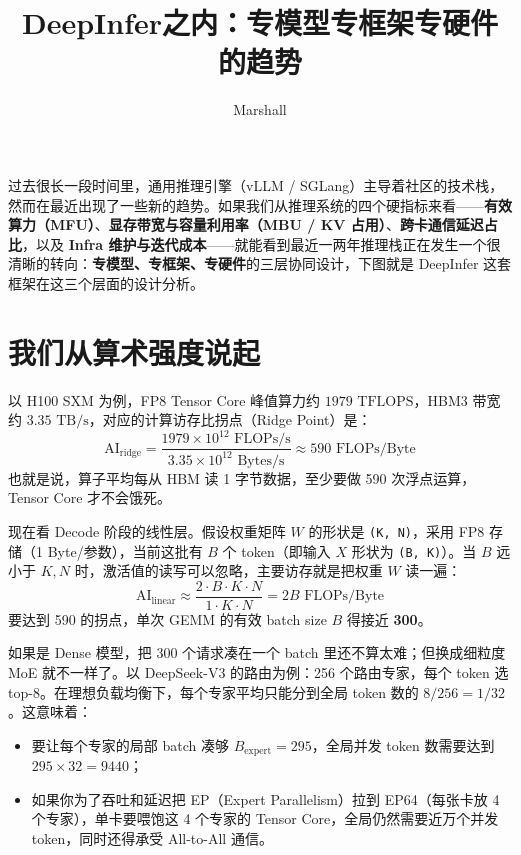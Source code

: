 \documentclass[11pt]{article}
\title{DeepInfer之内：专模型专框架专硬件的趋势}
\author{Marshall}
\begin{document}
\maketitle

过去很长一段时间里，通用推理引擎（vLLM / SGLang）主导着社区的技术栈，然而在最近出现了一些新的趋势。如果我们从推理系统的四个硬指标来看——\textbf{有效算力（MFU）}、\textbf{显存带宽与容量利用率（MBU / KV 占用）}、\textbf{跨卡通信延迟占比}，以及 \textbf{Infra 维护与迭代成本}——就能看到最近一两年推理栈正在发生一个很清晰的转向：\textbf{专模型、专框架、专硬件}的三层协同设计，下图就是 DeepInfer 这套框架在这三个层面的设计分析。

\section{我们从算术强度说起}

以 H100 SXM 为例，FP8 Tensor Core 峰值算力约 $1979\text{ TFLOPS}$，HBM3 带宽约 $3.35\text{ TB/s}$，对应的计算访存比拐点（Ridge Point）是：
\[
  \text{AI}_{\text{ridge}} = \frac{1979 \times 10^{12}\text{ FLOPs/s}}{3.35 \times 10^{12}\text{ Bytes/s}} \approx 590\text{ FLOPs/Byte}
\]
也就是说，算子平均每从 HBM 读 1 字节数据，至少要做 590 次浮点运算，Tensor Core 才不会饿死。

现在看 Decode 阶段的线性层。假设权重矩阵 $W$ 的形状是 \texttt{(K, N)}，采用 FP8 存储（1 Byte/参数），当前这批有 $B$ 个 token（即输入 $X$ 形状为 \texttt{(B, K)}）。当 $B$ 远小于 $K, N$ 时，激活值的读写可以忽略，主要访存就是把权重 $W$ 读一遍：
\[
  \text{AI}_{\text{linear}} \approx \frac{2 \cdot B \cdot K \cdot N}{1 \cdot K \cdot N} = 2B\text{ FLOPs/Byte}
\]
要达到 590 的拐点，单次 GEMM 的有效 batch size $B$ 得接近 \textbf{300}。

如果是 Dense 模型，把 300 个请求凑在一个 batch 里还不算太难；但换成细粒度 MoE 就不一样了。以 DeepSeek-V3 的路由为例：256 个路由专家，每个 token 选 top-8。在理想负载均衡下，每个专家平均只能分到全局 token 数的 $8/256 = 1/32$。这意味着：

\begin{itemize}
  \item 要让每个专家的局部 batch 凑够 $B_{\text{expert}} = 295$，全局并发 token 数需要达到 $295 \times 32 = 9440$；
  \item 如果你为了吞吐和延迟把 EP（Expert Parallelism）拉到 EP64（每张卡放 4 个专家），单卡要喂饱这 4 个专家的 Tensor Core，全局仍然需要近万个并发 token，同时还得承受 All-to-All 通信。
\end{itemize}
\end{document}
